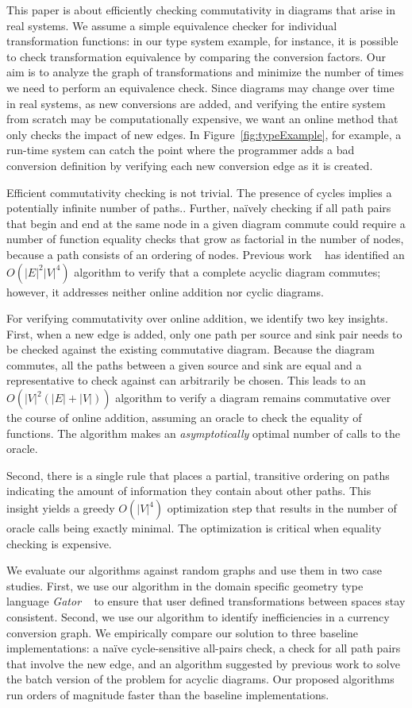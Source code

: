 \documentclass[sigplan]{acmart}
\begin{document}
This paper is about efficiently checking commutativity in diagrams that arise in real systems.
We assume a simple equivalence checker for individual transformation functions: in our type system example, for instance, it is possible to check transformation equivalence by comparing the conversion factors.
Our aim is to analyze the graph of transformations and minimize the number of times we need to perform an equivalence check.
Since diagrams may change over time in real systems, as new conversions are added, and verifying the entire system from scratch may be computationally expensive, we want an online method that only checks the impact of new edges.
In Figure~\ref{fig:typeExample}, for example, a run-time system can catch the point where the programmer adds a bad conversion definition by verifying each new conversion edge as it is created.

Efficient commutativity checking is not trivial.
The presence of cycles implies a potentially infinite number of paths..
Further, na\"{i}vely checking if all path pairs that begin and end at the same node in a given diagram commute could require a number of function equality checks that grow as factorial in the number of nodes, because a path consists of an ordering of nodes.
Previous work ~\cite{commutative} has identified an $O(|E|^2|V|^4)$ algorithm to verify that a complete acyclic diagram commutes; however, it addresses neither online addition nor cyclic diagrams.

For verifying commutativity over online addition, we identify two key insights.
First, when a new edge is added, only one path per source and sink pair needs to be checked against the existing commutative diagram.
Because the diagram commutes, all the paths between a given source and sink are equal and a representative to check against can arbitrarily be chosen.
This leads to an $O(|V|^2(|E|+|V|))$ algorithm to verify a diagram remains commutative over the course of online addition, assuming an oracle to check the equality of functions.
The algorithm makes an \emph{asymptotically} optimal number of calls to the oracle.

Second, there is a single rule that places a partial, transitive ordering on paths indicating the amount of information they contain about other paths.
This insight yields a greedy $O(|V|^4)$ optimization step that results in the number of oracle calls being exactly minimal.
The optimization is critical when equality checking is expensive.

We evaluate our algorithms against random graphs and use them in two case studies.
First, we use our algorithm in the domain specific geometry type language \textit{Gator} ~\cite{gator} to ensure that user defined transformations between spaces stay consistent.
Second, we use our algorithm to identify inefficiencies in a currency conversion graph.
%
We empirically compare our solution to three baseline implementations: a na\"{i}ve cycle-sensitive all-pairs check, a check for all path pairs that involve the new edge, and an algorithm suggested by previous work to solve the batch version of the problem for acyclic diagrams.
Our proposed algorithms run orders of magnitude faster than the baseline implementations.
\end{document}
